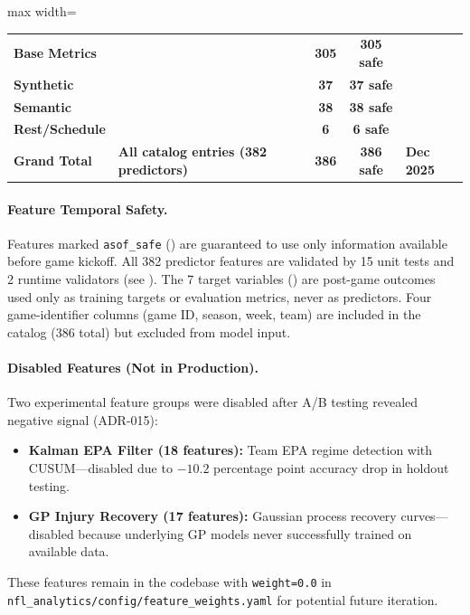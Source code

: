 \begin{table}[!ht]
\begin{adjustbox}{max width=\textwidth}
\begin{tabular}{@{}llccl@{}}
\midrule
\textbf{Base Metrics} & & \textbf{305} & \textbf{305 safe} & \\
\textbf{Synthetic} & & \textbf{37} & \textbf{37 safe} & \\
\textbf{Semantic} & & \textbf{38} & \textbf{38 safe} & \\
\textbf{Rest/Schedule} & & \textbf{6} & \textbf{6 safe} & \\
\midrule
\textbf{Grand Total} & \textbf{All catalog entries (382 predictors)} & \textbf{386} & \textbf{386 safe} & \textbf{Dec 2025} \\
\bottomrule
\end{tabular}
\end{adjustbox}
\end{table}

\paragraph{Feature Temporal Safety.}
Features marked \texttt{asof\_safe} (\checkmark) are guaranteed to use only information available before game kickoff. All 382 predictor features are validated by 15 unit tests and 2 runtime validators (see ). The 7 target variables () are post-game outcomes used only as training targets or evaluation metrics, never as predictors. Four game-identifier columns (game ID, season, week, team) are included in the catalog (386 total) but excluded from model input.

\paragraph{Disabled Features (Not in Production).}
Two experimental feature groups were disabled after A/B testing revealed negative signal (ADR-015):
\begin{itemize}
    \item \textbf{Kalman EPA Filter (18 features):} Team EPA regime detection with CUSUM---disabled due to $-10.2$ percentage point accuracy drop in holdout testing.
    \item \textbf{GP Injury Recovery (17 features):} Gaussian process recovery curves---disabled because underlying GP models never successfully trained on available data.
\end{itemize}
These features remain in the codebase with \texttt{weight=0.0} in \texttt{nfl\_analytics/config/\allowbreak feature\_weights.yaml} for potential future iteration.

